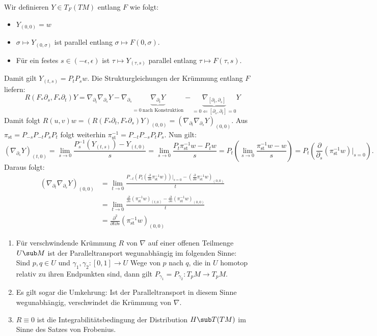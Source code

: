 \begin{beweis}
Wir definieren $Y \in T_F(TM)$ entlang $F$ wie folgt:
\begin{itemize}
\item $Y_{(0,0)} = w$
\item $\sigma \mapsto Y_{(0,\sigma)}$ ist parallel entlang $\sigma \mapsto F(0,\sigma)$.
\item Für ein festes $s \in (-\epsilon, \epsilon)$ ist $\tau \mapsto Y_{(\tau, s)}$ parallel entlang $\tau \mapsto F(\tau, s)$.
\end{itemize}
Damit gilt $Y_{(t,s)} = P_tP_sw$. Die Strukturgleichungen der Krümmung entlang $F$ liefern:
\begin{equation}
R(F_\ast \partial_s, F_\ast \partial_t)Y = \nabla_{\partial_t} \nabla_{\partial_s} Y - \nabla_{\partial_s} \underbrace{\nabla_{\partial_t} Y}_{=0 \ \text{nach Konstruktion}} - \underbrace{\nabla_{[\partial_t, \partial_s]}}_{=0 \Leftarrow [\partial_s, \partial_t] = 0} Y
\end{equation}
Damit folgt $R(u,v)w =(R(F_\ast \partial_t, F_\ast \partial_s)Y)_{(0,0)} = (\nabla_{\partial_t} \nabla_{\partial_s} Y)_{(0,0)}$. Aus $\pi_\text{st} = P_{-s}P_{-t}P_sP_t$ folgt weiterhin $\pi_\text{st}^{-1} = P_{-t}P_{-s}P_tP_s$. Nun gilt:
\begin{equation}
(\nabla_{\partial_s}Y)_{(t,0)} = \lim_{s \to 0} \frac{P_s^{-1}(Y_{(t,s)}) - Y_{(t,0)}}{s} = \lim_{s \to 0} \frac{P_t \pi_\text{st}^{-1} w - P_t w}{s} = P_t \left( \lim_{s \to 0} \frac{\pi^{-1}_\text{st} w-w}{s}\right) = P_t \left( \frac{\partial}{\partial_s} (\pi_\text{st}^{-1} w)|_{s=0} \right).
\end{equation}
Daraus folgt:
\begin{align}
(\nabla_{\partial_t} \nabla_{\partial_s} Y)_{(0,0)} &= \lim_{t \to 0} \frac{P_{-t}(P_t(\frac{\partial}{\partial s} \pi_\text{st}^{-1}w))|_{s=0} - (\frac{\partial}{\partial s} \pi_\text{st}^{-1}w)_{(0,0)}}{t} \\
&= \lim_{t \to 0} \frac{\frac{\partial}{\partial s} (\pi_\text{st}^{-1}w)_{(t,0)} - \frac{\partial}{\partial s} (\pi_\text{st}^{-1}w)_{(0,0)}}{t}\\
&= \frac{\partial^2}{\partial t \partial s}(\pi_\text{st}^{-1} w)_{(0,0)}
\end{align}
\end{beweis}
\begin{bemerkungen}
\begin{enumerate}
\item Für verschwindende Krümmung $R$ von $\nabla$ auf einer offenen Teilmenge $U \sub M$ ist der Paralleltransport wegunabhängig im folgenden Sinne:\\
Sind $p,q \in U$ und $\gamma_1, \gamma_2: [0,1] \to U$ Wege von $p$ nach $q$, die in $U$ homotop relativ zu ihren Endpunkten sind, dann gilt $P_{\gamma_1}=P_{\gamma_2}: T_pM \to T_pM$.
\item Es gilt sogar die Umkehrung: Ist der Paralleltransport in diesem Sinne wegunabhängig, verschwindet die Krümmung von $\nabla$.
\item $R \equiv 0$ ist die Integrabilitätsbedingung der Distribution $H \sub T(TM)$ im Sinne des Satzes von Frobenius. 
\end{enumerate}
\end{bemerkungen}
